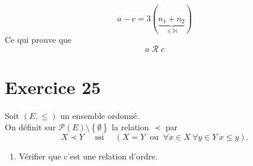 \documentclass{report}
\begin{document}
\begin{myproof}
\begin{enumerate}
\begin{enumerate}
      $$
      a - c = 3(\underbrace{n_1+n_2}_{\in \mathbb{N}})
      $$
      Ce qui prouve que 
      $$
      a \;\mathcal{R}\; c
      $$
  \end{enumerate}
  \end{enumerate}
  
\end{myproof}



\section{Exercice 25}
\qs{}
{
Soit $ (E, \leq)$ un ensemble ordonn\'e.\\
On d\'efinit sur $\mathcal{P} (E)\setminus\left\{ \emptyset \right\}$ la relation
$\prec$ par 
$$X \prec Y \quad \text{ ssi } \quad (X = Y \ \text{ ou } \ 
\forall x \in X \  \forall y \in Y \  x \leq y).$$ 
\begin{enumerate}
  \item  V\'erifier que c'est une relation d'ordre.
\end{enumerate}
}
\end{document}
